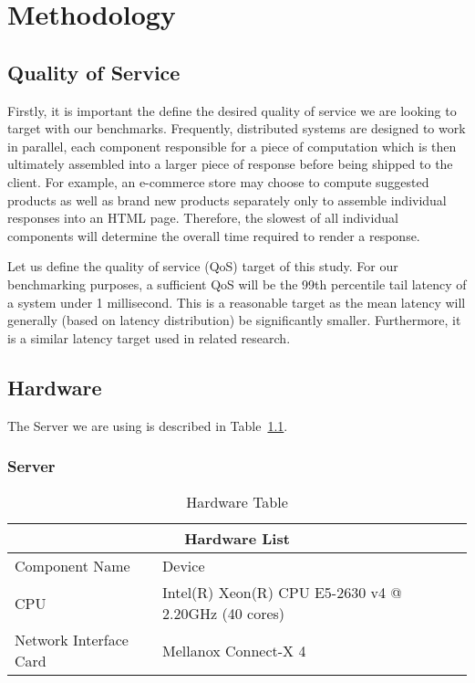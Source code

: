 \documentclass[bsc,frontabs,twoside,singlespacing,parskip,deptreport]{infthesis}     %
\begin{document}
\chapter{Methodology}



\section{Quality of Service}




Firstly, it is important the define the desired quality of service we are looking to target with our benchmarks. Frequently, distributed systems are designed to work in parallel, each component responsible for a piece of computation which is then ultimately assembled into a larger piece of response before being shipped to the client. For example, an e-commerce store may choose to compute suggested products as well as brand new products separately only to assemble individual responses into an HTML page. Therefore, the slowest of all individual components will determine the overall time required to render a response.





Let us define the quality of service (QoS) target of this study. For our benchmarking purposes, a sufficient  QoS will be the 99th percentile tail latency of a system under 1 millisecond. This is a reasonable target as the mean latency will generally (based on latency distribution) be significantly smaller. Furthermore, it is a similar latency target used in related research.






\section{Hardware}

The Server we are using is described in  Table~\ref{tab:hardware}.


\subsection{Server}


\begin{table}
\begin{tabular}{ |p{6cm}||p{6cm}|  }

 \hline
 \multicolumn{2}{|c|}{Hardware List} \\
 \hline
 Component Name & Device \\
 \hline
CPU & Intel(R) Xeon(R) CPU E5-2630 v4 @ 2.20GHz (40 cores) \\
 \hline
Network Interface Card & Mellanox Connect-X 4 \\
 \hline
 
 
\end{tabular}
\caption{Hardware Table}
\label{tab:hardware}

\end{table}
\end{document}
